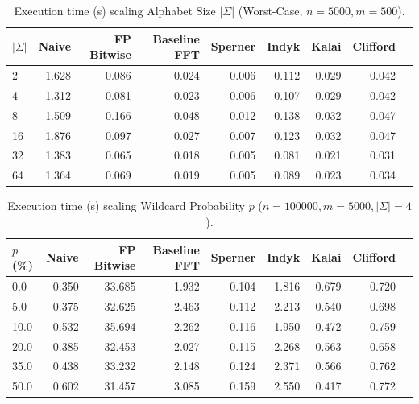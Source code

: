 \begin{table}[H]
\centering
\caption{Execution time (s) scaling Alphabet Size $|\Sigma|$ (Worst-Case, $n=5000, m=500$).}
\label{tab:app_worst_sigma_data}
\begin{tabular}{@{}lrrrrrrrr@{}}
\toprule
$|\Sigma|$ & Naive & FP Bitwise & Baseline FFT & Sperner & Indyk & Kalai & Clifford \\
\midrule
2  & 1.628 & 0.086 & 0.024 & 0.006 & 0.112 & 0.029 & 0.042 \\
4  & 1.312 & 0.081 & 0.023 & 0.006 & 0.107 & 0.029 & 0.042 \\
8  & 1.509 & 0.166 & 0.048 & 0.012 & 0.138 & 0.032 & 0.047 \\
16 & 1.876 & 0.097 & 0.027 & 0.007 & 0.123 & 0.032 & 0.047 \\
32 & 1.383 & 0.065 & 0.018 & 0.005 & 0.081 & 0.021 & 0.031 \\
64 & 1.364 & 0.069 & 0.019 & 0.005 & 0.089 & 0.023 & 0.034 \\
\bottomrule
\end{tabular}
\end{table}

\begin{table}[H]
\centering
\caption{Execution time (s) scaling Wildcard Probability $p$ ($n=100000, m=5000, |\Sigma|=4$).}
\label{tab:app_density_data}
\begin{tabular}{@{}lrrrrrrrr@{}}
\toprule
$p$ (\%) & Naive & FP Bitwise & Baseline FFT & Sperner & Indyk & Kalai & Clifford \\
\midrule
0.0  & 0.350 & 33.685 & 1.932 & 0.104 & 1.816 & 0.679 & 0.720 \\
5.0  & 0.375 & 32.625 & 2.463 & 0.112 & 2.213 & 0.540 & 0.698 \\
10.0 & 0.532 & 35.694 & 2.262 & 0.116 & 1.950 & 0.472 & 0.759 \\
20.0 & 0.385 & 32.453 & 2.027 & 0.115 & 2.268 & 0.563 & 0.658 \\
35.0 & 0.438 & 33.232 & 2.148 & 0.124 & 2.371 & 0.566 & 0.762 \\
50.0 & 0.602 & 31.457 & 3.085 & 0.159 & 2.550 & 0.417 & 0.772 \\
\bottomrule
\end{tabular}
\end{table}